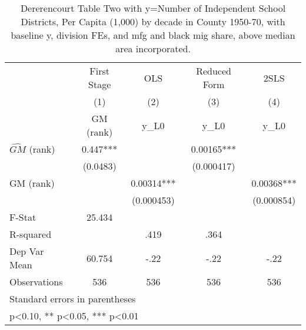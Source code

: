 \begin{table}[htbp]\centering
\def\sym#1{\ifmmode^{#1}\else\(^{#1}\)\fi}
\caption{Dererencourt Table Two with y=Number of Independent School Districts, Per Capita (1,000) by decade in County 1950-70, with baseline y, division FEs, and mfg and black mig share, above median area incorporated.}
\begin{tabular}{l*{4}{c}}
\toprule
                    & First Stage   &         OLS   &Reduced Form   &        2SLS   \\
                    &\multicolumn{1}{c}{(1)}&\multicolumn{1}{c}{(2)}&\multicolumn{1}{c}{(3)}&\multicolumn{1}{c}{(4)}\\
                    &\multicolumn{1}{c}{GM  (rank)}&\multicolumn{1}{c}{y\_L0}&\multicolumn{1}{c}{y\_L0}&\multicolumn{1}{c}{y\_L0}\\
\midrule
$\hat{GM}$ (rank)   &       0.447***&               &     0.00165***&               \\
                    &    (0.0483)   &               &  (0.000417)   &               \\
\addlinespace
GM  (rank)          &               &     0.00314***&               &     0.00368***\\
                    &               &  (0.000453)   &               &  (0.000854)   \\
\midrule
F-Stat              &      25.434   &               &               &               \\
R-squared           &               &        .419   &        .364   &               \\
Dep Var Mean        &      60.754   &        -.22   &        -.22   &        -.22   \\
Observations        &         536   &         536   &         536   &         536   \\
\bottomrule
\multicolumn{5}{l}{\footnotesize Standard errors in parentheses}\\
\multicolumn{5}{l}{\footnotesize * p<0.10, ** p<0.05, *** p<0.01}\\
\end{tabular}
\end{table}
